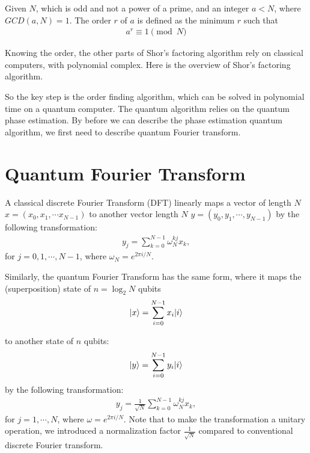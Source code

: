 \begin{lemma}
Given \(N\), which is odd and not a power of a prime, and an integer \(a < N\), where  \(GCD(a, N) = 1\). The order \(r\) of \(a\) is defined as the minimum  \(r\) such that
\begin{align*}
    a^{r} \equiv 1 \pmod{N}
\end{align*}
\end{lemma}

Knowing the order, the other parts of Shor's factoring algorithm rely on classical computers, with polynomial complex. Here is the overview of Shor's factoring algorithm.


So the key step is the order finding algorithm, which can be solved in polynomial time on a quantum computer. The quantum algorithm relies on the quantum phase estimation. By before we can describe the phase estimation quantum algorithm, we first need to describe quantum Fourier transform.



\section{Quantum Fourier Transform}
A classical discrete Fourier Transform (DFT) linearly maps a vector of length \(N\) \(x = (x_0, x_1, \cdots x_{N-1})\) to another vector length \(N\) \(y=(y_0, y_1, \cdots, y_{N-1})\) by the following transformation: 
\begin{align*}
    y_j = \sum_{k=0}^{N-1} \omega_{N}^{kj} x_k,
\end{align*}
for \(j=0, 1, \cdots, N-1\), where \(\omega_{N} = e^{2\pi i/N}. \)

Similarly, the quantum Fourier Transform has the same form, where it maps the (superposition) state of \(n=\log_2 N\) qubits
\begin{align}
    \lvert x\rangle = \sum_{i=0}^{N-1} x_i \lvert i\rangle
\end{align}

to another state of \(n\) qubits:
\begin{align}
    \lvert y\rangle = \sum_{i=0}^{N-1} y_i \lvert i\rangle
\end{align}
by the following transformation: 
\begin{align*}
    y_j = \frac{1}{\sqrt{N}} \sum_{k=0}^{N-1} \omega_{N}^{kj} x_k,
\end{align*}
for \(j=1, \cdots, N\), where \(\omega = e^{2\pi i/N}. \) Note that to make the transformation a unitary operation, we introduced a normalization factor \(\frac{1}{\sqrt{N}}\) compared to conventional discrete Fourier transform. 


